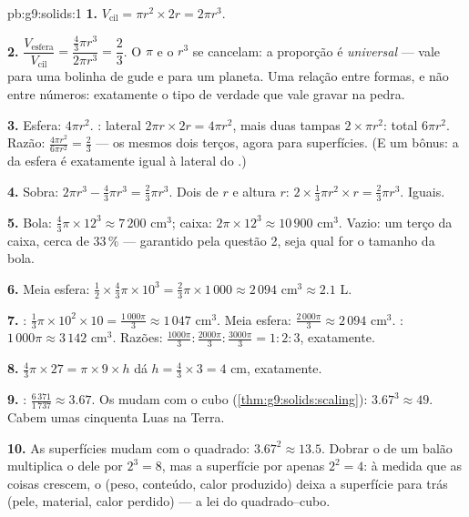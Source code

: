 \begin{solution}{pb:g9:solids:1}
\textbf{1.} $V_{\text{cil}} = \pi r^2 \times 2r = 2\pi r^3$.

\textbf{2.} $\dfrac{V_{\text{esfera}}}{V_{\text{cil}}}
= \dfrac{\frac43 \pi r^3}{2 \pi r^3} = \dfrac23$. O $\pi$ e o $r^3$ se
cancelam: a proporção é \emph{universal} --- vale para uma bolinha de
gude e para um planeta. Uma relação entre formas, e não entre números:
exatamente o tipo de verdade que vale gravar na pedra.

\textbf{3.} Esfera: $4\pi r^2$. : lateral
$2\pi r \times 2r = 4\pi r^2$, mais duas tampas
$2 \times \pi r^2$: total $6\pi r^2$. Razão:
$\frac{4\pi r^2}{6\pi r^2} = \frac23$ --- os mesmos dois terços, agora
para superfícies. (E um bônus: a  da esfera é exatamente igual à
 lateral do .)

\textbf{4.} Sobra: $2\pi r^3 - \frac43\pi r^3 = \frac23 \pi r^3$. Dois
 de  $r$ e altura $r$:
$2 \times \frac13 \pi r^2 \times r = \frac23 \pi r^3$. Iguais.

\textbf{5.} Bola: $\frac43 \pi \times 12^3 \approx 7\,200$ cm$^3$;
caixa: $2\pi \times 12^3 \approx 10\,900$ cm$^3$. Vazio: um terço da
caixa, cerca de $33\,\%$ --- garantido pela questão 2, seja qual for o
tamanho da bola.

\textbf{6.} Meia esfera:
$\frac12 \times \frac43 \pi \times 10^3 = \frac23 \pi \times 1\,000
\approx 2\,094$ cm$^3 \approx 2.1$ L.

\textbf{7.} : $\frac13 \pi \times 10^2 \times 10 =
\frac{1\,000\pi}{3} \approx 1\,047$ cm$^3$. Meia esfera:
$\frac{2\,000\pi}{3} \approx 2\,094$ cm$^3$. :
$1\,000\pi \approx 3\,142$ cm$^3$. Razões:
$\frac{1000\pi}{3} : \frac{2000\pi}{3} : \frac{3000\pi}{3}
= 1 : 2 : 3$, exatamente.

\textbf{8.} $\frac43 \pi \times 27 = \pi \times 9 \times h$ dá
$h = \frac43 \times 3 = 4$ cm, exatamente.

\textbf{9.} : $\frac{6\,371}{1\,737} \approx 3.67$. Os 
mudam com o cubo (\cref{thm:g9:solids:scaling}):
$3.67^3 \approx 49$. Cabem umas cinquenta Luas na Terra.

\textbf{10.} As superfícies mudam com o quadrado:
$3.67^2 \approx 13.5$. Dobrar o  de um balão multiplica o 
dele por $2^3 = 8$, mas a superfície por apenas $2^2 = 4$: à medida que
as coisas crescem, o  (peso, conteúdo, calor produzido) deixa a
superfície para trás (pele, material, calor perdido) --- a lei do
quadrado--cubo.


\end{solution}
